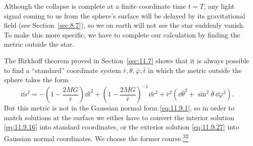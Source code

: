 Although the collapse is complete at a finite coordinate time \(t=T\), any
light signal coming to us from the sphere's surface will be delayed by its
gravitational field (see Section~\ref{sec:8.7}), so we on earth will not see
the star suddenly vanish. To make this more specific, we have to complete our
calculation by finding the metric outside the star.

The Birkhoff theorem proved in Section~\ref{sec:11.7} shows that it is always
possible to find a ``standard'' coordinate system
\(\bar r,\bar\theta,\bar\varphi,\bar t\) in which the metric outside the
sphere takes the form
\begin{equation}
  \dd s^2
  =
  -\left(1-\frac{2MG}{\bar r}\right)\dd\bar t^2
  +\left(1-\frac{2MG}{\bar r}\right)^{-1}\dd\bar r^2
  +\bar r^2(\dd\bar\theta^2+\sin^2\bar\theta\,\dd\bar\varphi^2).
  \tag{11.9.27}\label{eq:11.9.27}
\end{equation}
But this metric is not in the Gaussian normal form \eqref{eq:11.9.1}, so in
order to match solutions at the surface we either have to convert the
interior solution \eqref{eq:11.9.16} into standard coordinates, or the
exterior solution \eqref{eq:11.9.27} into Gaussian normal coordinates. We
choose the former course.\hyperref[ch11-ref-32]{\textsuperscript{32}}

